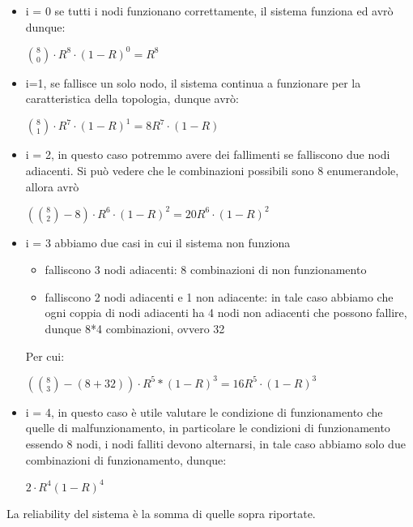 \begin{itemize}
    \item i = 0 se tutti i nodi funzionano correttamente, il sistema funziona ed avrò dunque:
    \begin{center}
        $
        \binom{8}{0} \cdot R^{8} \cdot (1-R)^0 = R^8
        $
    \end{center}
    \item i=1, se fallisce un solo nodo, il sistema continua a funzionare per la caratteristica della topologia, dunque avrò:
        \begin{center}
        $
        \binom{8}{1} \cdot R^{7} \cdot (1-R)^1 = 8R^7 \cdot (1-R)
        $
        \end{center}
    \item i = 2, in questo caso potremmo avere dei fallimenti se falliscono due nodi adiacenti. Si può vedere che le combinazioni possibili sono 8 enumerandole, allora avrò
        \begin{center}
        $
        (\binom{8}{2}-8) \cdot R^{6} \cdot (1-R)^2 = 20R^6 \cdot (1-R)^2
        $
        \end{center}
       \item i = 3 abbiamo due casi in cui il sistema non funziona
       \begin{itemize}
           \item falliscono 3 nodi adiacenti: 8 combinazioni di non funzionamento
           \item falliscono 2 nodi adiacenti e 1 non adiacente: in tale caso abbiamo che ogni coppia di nodi adiacenti ha 4 nodi non adiacenti che possono fallire, dunque 8*4 combinazioni, ovvero 32 
       \end{itemize}
       Per cui:
        \begin{center}
        $
        (\binom{8}{3}-(8+32)) \cdot R^{5}*(1-R)^3 = 16R^5 \cdot (1-R)^3
        $
        \end{center}
    \item i = 4, in questo caso è utile valutare le condizione di funzionamento che quelle di malfunzionamento, in particolare le condizioni di funzionamento essendo 8 nodi, i nodi falliti devono alternarsi, in tale caso abbiamo solo due combinazioni di funzionamento, dunque:
        \begin{center}
        $
        2 \cdot R^4(1-R)^4
        $
        \end{center}
\end{itemize}
La reliability del sistema è la somma di quelle sopra riportate.
